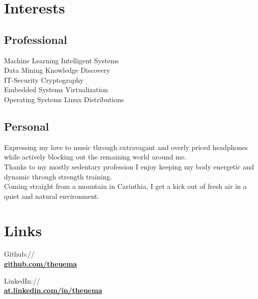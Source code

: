 \documentclass[]{resume}
\begin{document}
\vfill
\begin{minipage}[t]{0.33\textwidth} 
\section{Interests} 
\subsection{Professional}
Machine Learning \textbullet{} Intelligent Systems\\
Data Mining \textbullet{} Knowledge Discovery\\
IT-Security \textbullet{} Cryptography\\
Embedded Systems \textbullet{} Virtualization\\
Operating Systems \textbullet{} Linux Distributions\\
\sectionsep

\subsection{Personal}
	Expressing my love to music through extravagant and overly priced headphones while actively blocking out the remaining world around me. \\ \sectionsep
	Thanks to my mostly sedentary profession I enjoy keeping my body energetic and dynamic through strength training. \\ \sectionsep
	Coming straight from a mountain in Carinthia, I get a kick out of fresh air in a quiet and natural environment. 
	\sectionsep
\section{Links}
Github://
\\\href{https://github.com/theuema}{\textbf{github.com/theuema}} \medsep

LinkedIn://
\\\href{https://www.linkedin.com/in/theuema}{\textbf{at.linkedin.com/in/theuema}} \medsep


\end{minipage}
\end{document}
